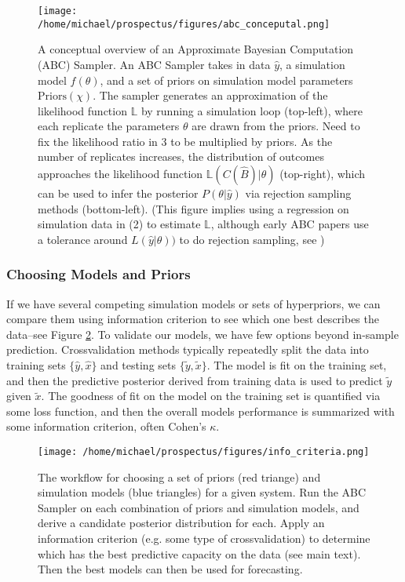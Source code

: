 \documentclass[]{article}
\begin{document}
\begin{figure}[H]
\centering
\texttt{[image: /home/michael/prospectus/figures/abc\_conceputal.png]}
\caption{ A conceptual overview of an Approximate Bayesian Computation (ABC) Sampler. An ABC Sampler takes in data $\hat{y}$, a simulation model $f(\theta)$, and a set of priors on simulation model parameters $\text{Priors}(\chi)$. The sampler generates an approximation of the likelihood function $\mathbb{L}$ by running a simulation loop (top-left), where each replicate the parameters $\theta$ are drawn from the priors. Need to fix the likelihood ratio in 3 to be multiplied by priors. As the number of replicates increases, the distribution of outcomes approaches the likelihood function  $\mathbb{L}(C(\hat{B}) | \theta)$ (top-right), which can be used to infer the posterior $P(\theta | \hat{y})$ via rejection sampling methods (bottom-left).  (This figure implies using a regression on simulation data in (2) to estimate $\mathbb{L}$, although early ABC papers use a tolerance around $L(\hat{y}|\theta))$ to do rejection sampling, see \cite{beaumont_approximate_2019})} \label{fig:abc}
\end{figure}


\hypertarget{choosing-models-and-priors}{%
\subsubsection{Choosing Models and Priors}\label{choosing-models-and-priors}}

If we have several competing simulation models or sets of hyperpriors, we can compare them using information criterion to see which one best describes the data--see Figure \ref{fig:info}.
To validate our models, we have few options beyond in-sample prediction. Crossvalidation methods typically repeatedly split the data into training sets $\{\hat{y}, \hat{x}\}$ and testing sets $\{\tilde{y}, \tilde{x}\}$. The model is fit on the training set, and then the predictive posterior derived from training data is used to predict $\tilde{y}$ given $\tilde{x}$. The goodness of fit on the model on the training set is quantified via some loss function, and then the overall models performance is summarized with some information criterion, often Cohen's $\kappa$.

\begin{figure}[H]
\centering
\texttt{[image: /home/michael/prospectus/figures/info\_criteria.png]}
\caption{The workflow for choosing a set of priors (red triange) and simulation models (blue triangles) for a given system. Run the ABC Sampler on each combination of priors and simulation models, and derive a candidate posterior distribution for each. Apply an information criterion (e.g. some type of crossvalidation) to determine which has the best predictive capacity on the data (see main text). Then the best models can then be used for forecasting. } \label{fig:info}
\end{figure}
\end{document}
